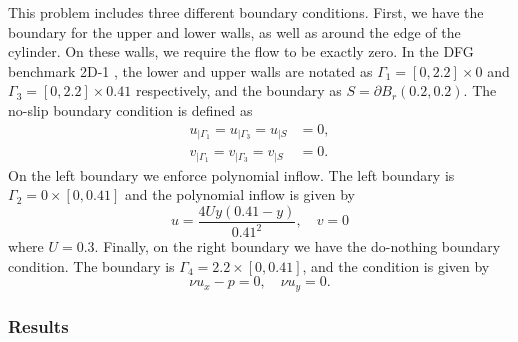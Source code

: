 This problem includes three different boundary conditions.
First, we have the boundary for the upper and lower walls, as well as around the edge of the cylinder.
On these walls, we require the flow to be exactly zero.
In the DFG benchmark 2D-1 \cite{DFG}, the lower and upper walls are notated as $\Gamma_1 = [0,2.2]\times 0$ and $\Gamma_3 = [0,2.2]\times 0.41$ respectively, and the boundary as $S=\partial B_r(0.2,0.2)$.
The no-slip boundary condition is defined as
\begin{align*}
    u_{|\Gamma_1} = u_{|\Gamma_3} = u_{|S} &= 0, \\
    v_{|\Gamma_1} = v_{|\Gamma_3} = v_{|S} &= 0.
\end{align*}
On the left boundary we enforce polynomial inflow.
The left boundary is $\Gamma_2 = 0\times [0,0.41]$ and the polynomial inflow is given by
\begin{equation*}
    u=\frac{4Uy(0.41-y)}{0.41^2}, \quad v=0
\end{equation*}
where $U=0.3$.
Finally, on the right boundary we have the do-nothing boundary condition.
The boundary is $\Gamma_4=2.2\times[0,0.41]$, and the condition is given by
\begin{equation*}
    \nu u_x - p = 0, \quad \nu u_y = 0.
\end{equation*}

\subsubsection{Results}